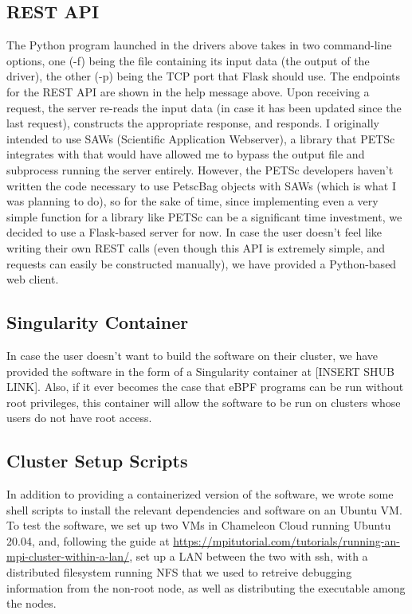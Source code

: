 \documentclass[11pt]{article}
\begin{document}
\subsection*{REST API}
The Python program launched in the drivers above takes in two command-line options, one (-f) being the file containing its input data (the output of the driver), the other (-p) being the TCP port that Flask should use.
The endpoints for the REST API are shown in the help message above. Upon receiving a request, the server re-reads the input data (in case it has been updated since the last request), constructs the appropriate response, and responds. I originally intended to use SAWs (Scientific Application Webserver), a library that PETSc integrates with that would have allowed me to bypass the output file and subprocess running the server entirely. However, the PETSc developers haven't written the code necessary to use PetscBag objects with SAWs (which is what I was planning to do), so for the sake of time, since implementing even a very simple function for a library like PETSc can be a significant time investment, we decided to use a Flask-based server for now. In case the user doesn't feel like writing their own REST calls (even though this API is extremely simple, and requests can easily be constructed manually), we have provided a Python-based web client.
\subsection*{Singularity Container}
In case the user doesn't want to build the software on their cluster, we have provided the software in the form of a Singularity container at [INSERT SHUB LINK]. Also, if it ever becomes the case that eBPF programs can be run without root privileges, this container will allow the software to be run on clusters whose users do not have root access. 
\subsection*{Cluster Setup Scripts}
In addition to providing a containerized version of the software, we wrote some shell scripts to install the relevant dependencies and software on an Ubuntu VM. To test the software, we set up two VMs in Chameleon Cloud running Ubuntu 20.04, and, following the guide at \url{https://mpitutorial.com/tutorials/running-an-mpi-cluster-within-a-lan/}, set up a LAN between the two with ssh, with a distributed filesystem running NFS that we used to retreive debugging information from the non-root node, as well as distributing the executable among the nodes.
\end{document}
